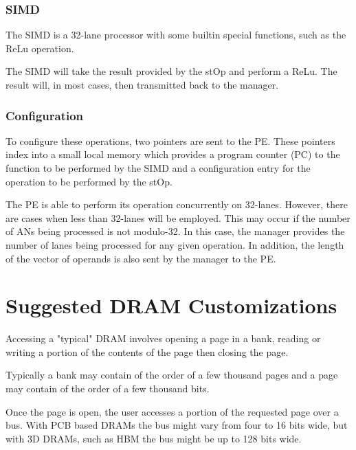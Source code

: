 \documentclass[journal]{IEEEtran}
\begin{document}
\subsubsection{SIMD}
\label{ssec:SIMD}

The SIMD is a 32-lane processor with some builtin special functions, such as the ReLu operation.

The SIMD will take the result provided by the stOp and perform a ReLu. The result will, in most cases, then transmitted back to the manager.

\subsubsection{Configuration}
\label{ssec:peConfiguration}

To configure these operations, two pointers are sent to the PE. These pointers index into a small local memory which provides a program counter (PC) to the function to be performed by the SIMD and a configuration entry for the operation to be performed by the stOp.

The PE is able to perform its operation concurrently on 32-lanes. However, there are cases when less than 32-lanes will be employed. This may occur if the number of ANs being processed is not modulo-32. In this case, the manager provides the number of lanes being processed for any given operation. In addition, the length of the vector of operands is also sent by the manager to the PE.

\section{Suggested DRAM Customizations}
\label{sec:Suggested DRAM Customizations}

Accessing a "typical" DRAM involves opening a page in a bank, reading or writing a portion of the contents of the page then closing the page.

Typically a bank may contain of the order of a few thousand pages and a page may contain of the order of a few thousand bits.

Once the page is open, the user accesses a portion of the requested page over a bus. With PCB based DRAMs the bus might vary from four to 16 bits wide, but with 3D DRAMs, such as HBM the bus might be up to 128 bits wide.
\end{document}
